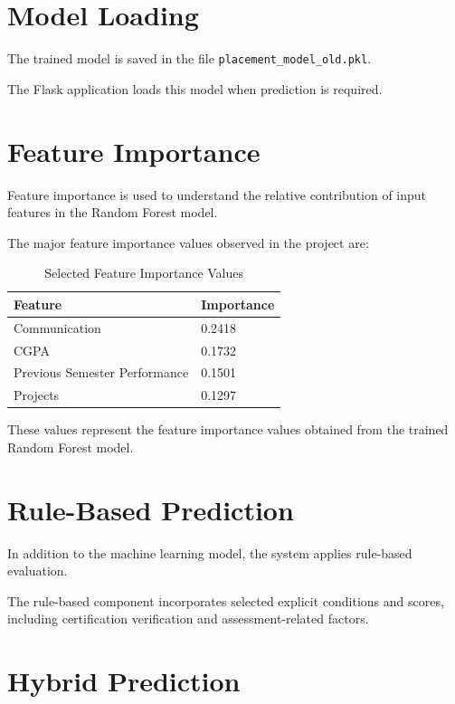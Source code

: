 \documentclass[12pt,a4paper]{report}
\begin{document}
\section{Model Loading}

The trained model is saved in the file
\texttt{placement\_model\_old.pkl}.

The Flask application loads this model when prediction is
required.

\section{Feature Importance}

Feature importance is used to understand the relative contribution
of input features in the Random Forest model.

The major feature importance values observed in the project are:

\begin{table}[H]
\centering
\caption{Selected Feature Importance Values}

\begin{tabular}{p{}p{}}
\toprule
\textbf{Feature} & \textbf{Importance} \\
\midrule
Communication & 0.2418 \\
CGPA & 0.1732 \\
Previous Semester Performance & 0.1501 \\
Projects & 0.1297 \\
\bottomrule
\end{tabular}
\end{table}

These values represent the feature importance values obtained
from the trained Random Forest model.

\section{Rule-Based Prediction}

In addition to the machine learning model, the system applies
rule-based evaluation.

The rule-based component incorporates selected explicit
conditions and scores, including certification verification and
assessment-related factors.

\section{Hybrid Prediction}
\end{document}
